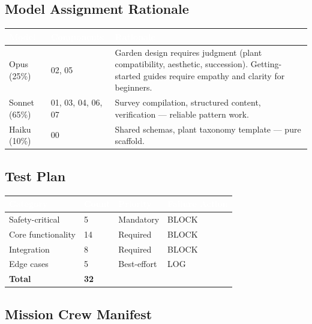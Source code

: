 \documentclass[11pt,letterpaper]{article}
\newcommand{\tableheader}[1]{\textbf{\sffamily\textcolor{white}{#1}}}
\begin{document}
\subsection{Model Assignment Rationale}

\begin{center}
\begin{tabularx}{\textwidth}{C{1.5cm}L{3cm}X}
\toprule
{}
\tableheader{Model} & \tableheader{Components} & \tableheader{Rationale} \\
\midrule
Opus (25\%) & 02, 05 & Garden design requires judgment (plant compatibility, aesthetic, succession). Getting-started guides require empathy and clarity for beginners. \\
Sonnet (65\%) & 01, 03, 04, 06, 07 & Survey compilation, structured content, verification --- reliable pattern work. \\
Haiku (10\%) & 00 & Shared schemas, plant taxonomy template --- pure scaffold. \\
\bottomrule
\end{tabularx}
\end{center}

\subsection{Test Plan}

\begin{center}
\begin{tabularx}{\textwidth}{L{3cm}C{1.5cm}C{1.5cm}C{2cm}}
\toprule
{}
\tableheader{Category} & \tableheader{Count} & \tableheader{Priority} & \tableheader{Failure Action} \\
\midrule
Safety-critical & 5 & Mandatory & BLOCK \\
Core functionality & 14 & Required & BLOCK \\
Integration & 8 & Required & BLOCK \\
Edge cases & 5 & Best-effort & LOG \\
\midrule
\textbf{Total} & \textbf{32} & & \\
\bottomrule
\end{tabularx}
\end{center}

\subsection{Mission Crew Manifest}
\end{document}
